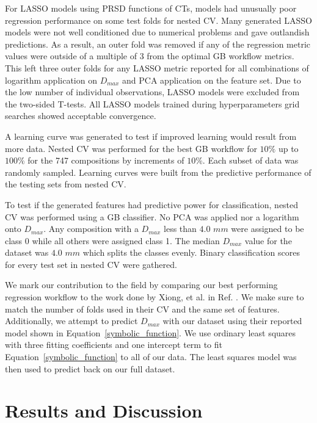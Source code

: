 \documentclass[11pt,a4paper]{article}
\begin{document}
\par
For LASSO models using PRSD functions of CTs, models had unusually poor regression performance on some test folds for nested CV. Many generated LASSO models were not well conditioned due to numerical problems and gave outlandish predictions. As a result, an outer fold was removed if any of the regression metric values were outside of a multiple of 3 from the optimal GB workflow metrics. This left three outer folds for any LASSO metric reported for all combinations of logarithm application on $D_{max}$ and PCA application on the feature set. Due to the low number of individual observations, LASSO models were excluded from the two-sided T-tests. All LASSO models trained during hyperparameters grid searches showed acceptable convergence.

\par
A learning curve was generated to test if improved learning would result from more data. Nested CV was performed for the best GB workflow for $10\%$ up to $100\%$ for the 747 compositions by increments of $10\%$. Each subset of data was randomly sampled. Learning curves were built from the predictive performance of the testing sets from nested CV.

\par
To test if the generated features had predictive power for classification, nested CV was performed using a GB classifier. No PCA was applied nor a logarithm onto $D_{max}$. Any composition with a $D_{max}$ less than $4.0$ $mm$ were assigned to be class 0 while all others were assigned class 1. The median $D_{max}$ value for the dataset was $4.0$ $mm$ which splits the classes evenly. Binary classification scores for every test set in nested CV were gathered.

\par
We mark our contribution to the field by comparing our best performing regression workflow to the work done by Xiong, et al. in Ref. \cite{Xiong2020}. We make sure to match the number of folds used in their CV and the same set of features. Additionally, we attempt to predict $D_{max}$ with our dataset using their reported model shown in Equation~\ref{symbolic_function}. We use ordinary least squares with three fitting coefficients and one intercept term to fit Equation~\ref{symbolic_function} to all of our data. The least squares model was then used to predict back on our full dataset.

\section{Results and Discussion}\label{res_desc}
\end{document}
